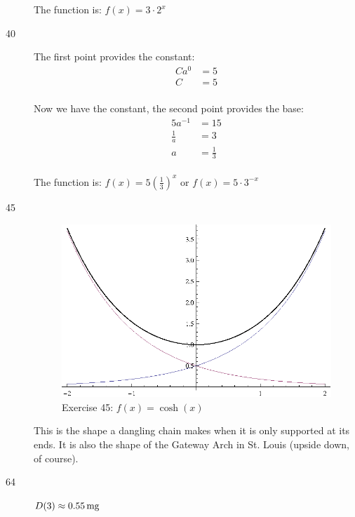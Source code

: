 \documentclass{exam}
\begin{document}
\begin{description}
        The function is: $f(x) = 3 \cdot 2^x$

      \item[40]
        The first point provides the constant:
        \begin{align*}
          Ca^0 &= 5 \\
          C    &= 5 \\
        \end{align*}

        Now we have the constant, the second point provides the base:
        \begin{align*}
          5a^{-1}     &= 15 \\
          \frac{1}{a} &= 3 \\
          a           &= \frac{1}{3} \\
        \end{align*}

        The function is: $f(x) = 5 \left( \frac{1}{3} \right)^x$ or $f(x) = 5 \cdot 3^{-x}$

      \item[45] 
        \begin{figure}[H]
          \centering
          \includegraphics[scale=0.9]{exercise45.eps}
          \caption*{Exercise 45: $f(x) = \cosh(x)$}
        \end{figure}

        This is the shape a dangling chain makes when it is only supported at its ends.  It is also the shape of the
        Gateway Arch in St. Louis (upside down, of course).

      \item[64] $D(3) \approx \unit[0.55]{mg}$



\end{description}
\end{document}
